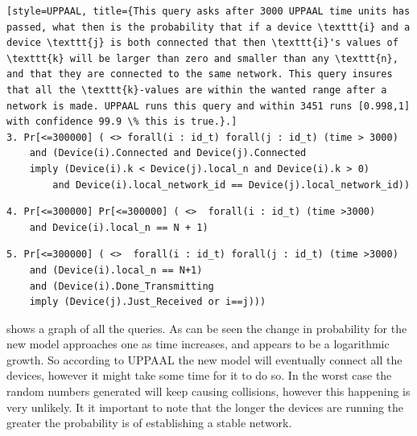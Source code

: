 \begin{lstlisting}[style=UPPAAL, title={This query asks after 3000 UPPAAL time units has passed, what then is the probability that if a device \texttt{i} and a device \texttt{j} is both connected that then \texttt{i}'s values of \texttt{k} will be larger than zero and smaller than any \texttt{n}, and that they are connected to the same network. This query insures that all the \texttt{k}-values are within the wanted range after a network is made. UPPAAL runs this query and within 3451 runs [0.998,1] with confidence 99.9 \% this is true.}.]
3. Pr[<=300000] ( <> forall(i : id_t) forall(j : id_t) (time > 3000) 
    and (Device(i).Connected and Device(j).Connected 
    imply (Device(i).k < Device(j).local_n and Device(i).k > 0) 
        and Device(i).local_network_id == Device(j).local_network_id))

\end{lstlisting}

\begin{lstlisting}[style=UPPAAL, title={This query asks after 3000 UPPAAL time units has passed, what then is the probability that a device \texttt{i} has a local value of \texttt{n} to be equal to the number of devices plus the the empty slot, which is \texttt{N} + 1, which means that all devices are in the same network. UPPAAL runs this query and within 3451 runs [0.998,1] with confidence 99.9 \% this is true.}]
4. Pr[<=300000] Pr[<=300000] ( <>  forall(i : id_t) (time >3000) 
    and Device(i).local_n == N + 1)
\end{lstlisting}

\begin{lstlisting}[style=UPPAAL, title={This query is a generalisation of the previous which includes a check of whether when one device finish transmitting then the rest are just finished receiving. UPPAAL runs this query and within 3451 runs [0.998,1] with confidence 99.9 \% this is true.}]
5. Pr[<=300000] ( <>  forall(i : id_t) forall(j : id_t) (time >3000) 
    and (Device(i).local_n == N+1) 
    and (Device(i).Done_Transmitting 
    imply (Device(j).Just_Received or i==j)))
\end{lstlisting}

 shows a graph of all the queries.
As can be seen the change in probability for the new model approaches one as time increases, and appears to be a logarithmic growth.
So according to UPPAAL the new model will eventually connect all the devices, however it might take some time for it to do so.
In the worst case the random numbers generated will keep causing collisions, however this happening is very unlikely. 
It it important to note that the longer the devices are running the greater the probability is of establishing a stable network.

